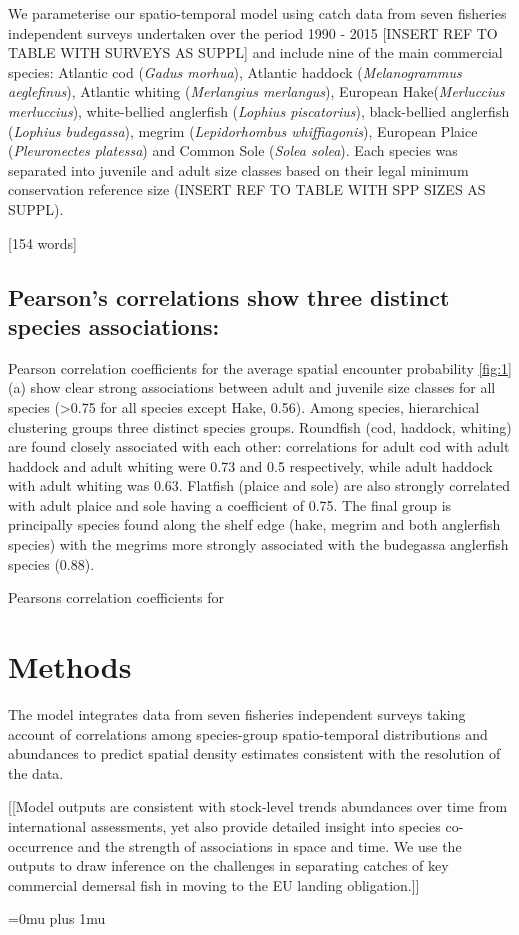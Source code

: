 \documentclass{nature}
\begin{document}
\begin{linenumbers}
We parameterise our spatio-temporal model using catch data from seven fisheries
independent surveys undertaken over the period 1990 - 2015 [INSERT REF TO TABLE
WITH SURVEYS AS SUPPL] and include nine of the main commercial species:
Atlantic cod (\textit{Gadus morhua}), Atlantic haddock (\textit{Melanogrammus
	aeglefinus}), Atlantic whiting (\textit{Merlangius merlangus}),
European Hake(\textit{Merluccius merluccius}), white-bellied anglerfish
(\textit{Lophius piscatorius}), black-bellied anglerfish (\textit{Lophius
	budegassa}), megrim (\textit{Lepidorhombus whiffiagonis}), European
Plaice (\textit{Pleuronectes platessa}) and Common Sole (\textit{Solea solea}).
Each species was separated into juvenile and adult size classes based on their
legal minimum conservation reference size (INSERT REF TO TABLE WITH SPP SIZES
AS SUPPL). 

[154 words]

\subsection{Pearson's correlations show three distinct species associations:}
Pearson correlation coefficients for the average spatial encounter probability
\ref{fig:1}(a) show clear strong associations between adult and juvenile size
classes for all species (\textgreater 0.75 for all species except Hake, 0.56).
Among species, hierarchical clustering groups three distinct species groups.
Roundfish (cod, haddock, whiting) are found closely associated with each other:
correlations for adult cod with adult haddock and adult whiting were 0.73 and
0.5 respectively, while adult haddock with adult whiting was 0.63. Flatfish
(plaice and sole) are also strongly correlated with adult plaice and sole
having a coefficient of 0.75. The final group is principally species found
along the shelf edge (hake, megrim and both anglerfish species) with the
megrims more strongly associated with the budegassa anglerfish species (0.88).

Pearsons correlation coefficients for 

\section*{Methods}

The model integrates data from seven fisheries independent surveys taking
account of correlations among species-group spatio-temporal distributions and
abundances to predict spatial density estimates consistent with the resolution
of the data. 

[[Model outputs are consistent with stock-level trends abundances over time
from international assessments, yet also provide detailed insight into species
co-occurrence and the strength of associations in space and time.  We use the
outputs to draw inference on the challenges in separating catches of key
commercial demersal fish in moving to the EU landing obligation.]]



\end{linenumbers}
\newpage
\Urlmuskip=0mu plus 1mu\relax

\small{}
\end{document}

